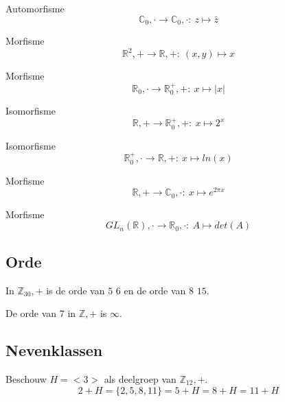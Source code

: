 \documentclass[main.tex]{subfiles}
\begin{document}
\begin{vb}
  Automorfisme
  \[ \mathbb{C}_{0},\cdot \rightarrow \mathbb{C}_{0},\cdot:\ z \mapsto \bar{z} \]
\end{vb}

\begin{vb}
  Morfisme
  \[ \mathbb{R}^{2},+ \rightarrow \mathbb{R},+:\ (x,y) \mapsto x \]
\end{vb}

\begin{vb}
  Morfisme
  \[ \mathbb{R}_{0},\cdot \rightarrow \mathbb{R}^{+}_{0},+:\ x \mapsto |x| \]
\end{vb}

\begin{vb}
  Isomorfisme
  \[ \mathbb{R},+ \rightarrow \mathbb{R}^{+}_{0},+:\ x \mapsto 2^{x} \]
\end{vb}

\begin{vb}
  Isomorfisme
  \[ \mathbb{R}^{+}_{0},\cdot \rightarrow \mathbb{R},+:\ x \mapsto ln(x) \]
\end{vb}

\begin{vb}
  Morfisme
  \[ \mathbb{R},+ \rightarrow \mathbb{C}_{0},\cdot:\ x \mapsto e^{2\pi x} \]
\end{vb}

\begin{vb}
  Morfisme
  \[ GL_{n}(\mathbb{R}),\cdot \rightarrow \mathbb{R}_{0},\cdot:\ A \mapsto det(A) \]
\end{vb}


\subsection{Orde}
\label{sec:orde}

\begin{vb}
  In $\mathbb{Z}_{30},+$ is de orde van $5$ $6$ en de orde van $8$ $15$.
\end{vb}

\begin{vb}
  De orde van $7$ in $\mathbb{Z},+$ is $\infty$.
\end{vb}

\subsection{Nevenklassen}
\label{sec:nevenklassen}

\begin{vb}
  Beschouw $H= <3>$ als deelgroep van $\mathbb{Z}_{12},+$.
  \[ 2 + H = \{ 2,5,8,11 \} = 5 + H = 8 + H = 11 + H \]
\end{vb}
\end{document}
